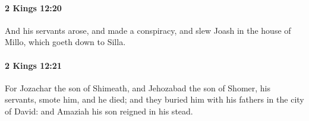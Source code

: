 		\paragraph{2 Kings 12:20} %
			\label{2KINGS-12-20}

			And his servants arose, and made a conspiracy, and slew Joash in the house of Millo, which goeth down to Silla.


		\paragraph{2 Kings 12:21} %
			\label{2KINGS-12-21}

			For Jozachar the son of Shimeath, and Jehozabad the son of Shomer, his servants, smote him, and he died; and they buried him with his fathers in the city of David: and Amaziah his son reigned in his stead.


